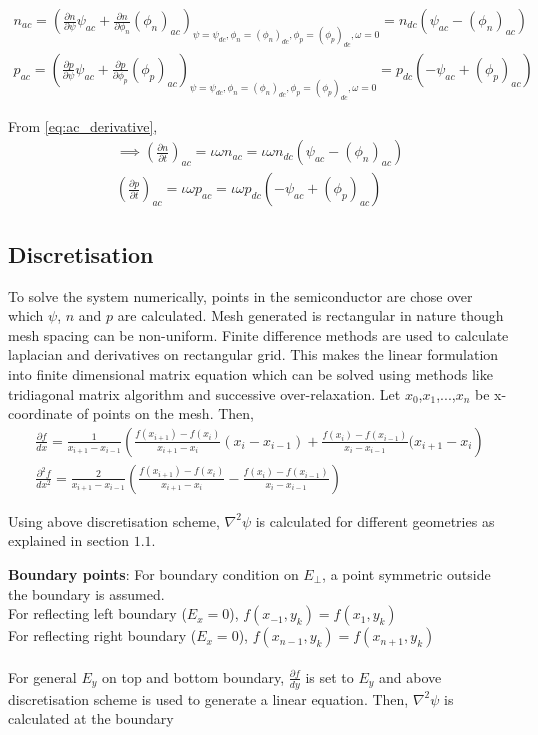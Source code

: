 \begin{align*}
n_{ac} = \left({\frac{\partial n}{\partial \psi} \psi_{ac}+ \frac{\partial n}{\partial \phi_n} ({\phi_n})_{ac}}\right)_{\psi=\psi_{dc},\phi_n=({\phi_n})_{dc},\phi_p = ({\phi_p})_{dc},\omega=0} = n_{dc} (\psi_{ac}-({\phi_n})_{ac}) \\
p_{ac} = \left({\frac{\partial p}{\partial \psi} \psi_{ac}+ \frac{\partial p}{\partial \phi_p} ({\phi_p})_{ac}}\right)_{\psi=\psi_{dc},\phi_n=({\phi_n})_{dc},\phi_p = ({\phi_p})_{dc},\omega=0} = p_{dc} (-\psi_{ac}+({\phi_p})_{ac})
\end{align*}

From \eqref{eq:ac_derivative},
\begin{align*}
\implies \left( \frac{\partial n}{\partial t} \right)_{ac} = \iota \omega n_{ac} = \iota \omega n_{dc} (\psi_{ac}-({\phi_n})_{ac})\\
\left( \frac{\partial p}{\partial t} \right)_{ac} = \iota \omega p_{ac} = \iota \omega p_{dc} (-\psi_{ac}+({\phi_p})_{ac})
\tag{2.16} \label{eq:ac_cont}
\end{align*}

\subsection{Discretisation}
To solve the system numerically, points in the semiconductor are chose over which $\psi$, $n$ and $p$ are calculated. Mesh generated is rectangular in nature though mesh spacing can be non-uniform. 
Finite difference methods are used to calculate laplacian and derivatives on rectangular grid. This makes the linear formulation into finite dimensional matrix equation which can be solved using methods like tridiagonal matrix algorithm and successive over-relaxation.
Let $x_0$,$x_1$,...,$x_n$ be x-coordinate of points on the mesh. Then,
\begin{align*}
\frac{\partial f}{dx} = \frac{1}{x_{i+1}-x_{i-1}}\left(\frac{f(x_{i+1})-f(x_{i})}{x_{i+1}-x_{i}} (x_{i}-x_{i-1}) + \frac{f(x_{i})-f(x_{i-1})}{x_{i}-x_{i-1}} (x_{i+1}-x_{i}\right)\\
\frac{\partial^2 f}{dx^2} = \frac{2}{x_{i+1}-x_{i-1}}\left(\frac{f(x_{i+1})-f(x_{i})}{x_{i+1}-x_{i}}  - \frac{f(x_{i})-f(x_{i-1})}{x_{i}-x_{i-1}} \right)
\tag{2.17} \label{eq:32}
\end{align*} 

Using above discretisation scheme, $\nabla^2 \psi$ is calculated for different geometries as explained in section $1.1$. 

\textbf{Boundary points}:
For boundary condition on $E_\perp$, a point symmetric outside the boundary is assumed.\\
For reflecting left boundary ($E_x = 0$), $f(x_{-1},y_k) = f(x_1,y_k)$ \\
For reflecting right boundary ($E_x = 0$), $f(x_{n-1},y_k) = f(x_{n+1},y_k)$ \\ \\
For general $E_y$ on top and bottom boundary, $\frac{\partial f}{dy}$ is set to $E_y$ and above discretisation scheme is used to generate a linear equation.
Then, $\nabla^2 \psi$ is calculated at the boundary

